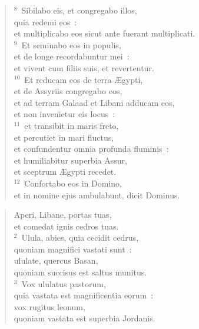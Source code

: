\begin{flushleft}
\begin{verse}
${}^{8}$~Sibilabo eis, et congregabo illos,\\ quia redemi eos~:\\ et multiplicabo eos sicut ante fuerant multiplicati.\\
${}^{9}$~Et seminabo eos in populis,\\ et de longe recordabuntur mei~:\\ et vivent cum filiis suis, et revertentur.\\
${}^{10}$~Et reducam eos de terra \AE gypti,\\ et de Assyriis congregabo eos,\\ et ad terram Galaad et Libani adducam eos,\\ et non invenietur eis locus~:\\
${}^{11}$~et transibit in maris freto,\\ et percutiet in mari fluctus,\\ et confundentur omnia profunda fluminis~:\\ et humiliabitur superbia Assur,\\ et sceptrum \AE gypti recedet.\\
${}^{12}$~Confortabo eos in Domino,\\ et in nomine ejus ambulabunt, dicit Dominus.\end{verse}\end{flushleft}


\begin{flushleft}\begin{verse}\vspace{-19pt}\hspace{6pt}Aperi, Libane, portas tuas,\\\hspace{6pt} et comedat ignis cedros tuas.\\
${}^{2}$~Ulula, abies, quia cecidit cedrus,\\ quoniam magnifici vastati sunt~:\\ ululate, quercus Basan,\\ quoniam succisus est saltus munitus.\\
${}^{3}$~Vox ululatus pastorum,\\ quia vastata est magnificentia eorum~:\\ vox rugitus leonum,\\ quoniam vastata est superbia Jordanis.\end{verse}\end{flushleft}


